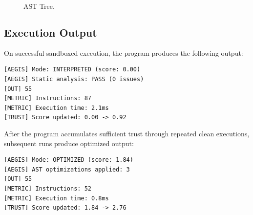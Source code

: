 \documentclass[conference]{IEEEtran}
\begin{document}
\begin{figure}[t]
\centering
{}
\caption{AST Tree.}
\label{fig:ast_tree}
\end{figure}

\subsection{Execution Output}

On successful sandboxed execution, the program produces the
following output:

\begin{lstlisting}[caption={Sandboxed execution output},
                   label={lst:output}]
[AEGIS] Mode: INTERPRETED (score: 0.00)
[AEGIS] Static analysis: PASS (0 issues)
[OUT] 55
[METRIC] Instructions: 87
[METRIC] Execution time: 2.1ms
[TRUST] Score updated: 0.00 -> 0.92
\end{lstlisting}

After the program accumulates sufficient trust through repeated
clean executions, subsequent runs produce optimized output:

\begin{lstlisting}[caption={Optimized execution output},
                   label={lst:opt_output}]
[AEGIS] Mode: OPTIMIZED (score: 1.84)
[AEGIS] AST optimizations applied: 3
[OUT] 55
[METRIC] Instructions: 52
[METRIC] Execution time: 0.8ms
[TRUST] Score updated: 1.84 -> 2.76
\end{lstlisting}
\end{document}
